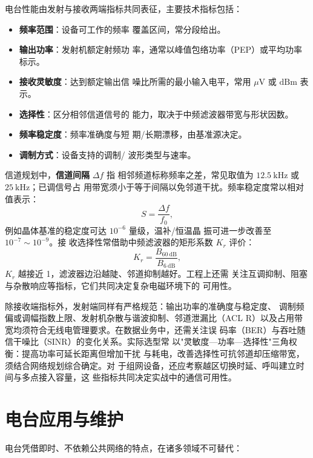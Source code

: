 电台性能由发射与接收两端指标共同表征，主要技术指标包括：

\begin{itemize}
    \item \textbf{频率范围}：设备可工作的频率
覆盖区间，常分段给出。
    \item \textbf{输出功率}：发射机额定射频功
率，通常以峰值包络功率（PEP）或平均功率标示。
    \item \textbf{接收灵敏度}：达到额定输出信
噪比所需的最小输入电平，常用 $\mu\mathrm{V}$ 或
 $\mathrm{dBm}$ 表示。
    \item \textbf{选择性}：区分相邻信道信号的
能力，取决于中频滤波器带宽与形状因数。
    \item \textbf{频率稳定度}：频率准确度与短
期/长期漂移，由基准源决定。
    \item \textbf{调制方式}：设备支持的调制/
波形类型与速率。
\end{itemize}

信道规划中，\textbf{信道间隔} $\Delta f$ 指
相邻频道标称频率之差，常见取值为 $12.5\ \mathrm{
kHz}$ 或 $25\ \mathrm{kHz}$；已调信号占
用带宽须小于等于间隔以免邻道干扰。频率稳定度常以相对值表示：
\begin{equation}
S = \frac{\Delta f}{f_0},
\end{equation}
例如晶体基准的稳定度可达 $10^{-6}$ 量级，温补/恒温晶
振可进一步改善至 $10^{-7}\sim 10^{-9}$。接
收选择性常借助中频滤波器的矩形系数 $K_{r}$ 评价：
\begin{equation}
K_r = \frac{B_{60\ \mathrm{dB}}}{B_{6\ \mathrm{dB}}},
\end{equation}
$K_r$ 越接近 1，滤波器边沿越陡、邻道抑制越好。工程上还需
关注互调抑制、阻塞与杂散响应等指标，它们共同决定复杂电磁环境下的
可用性。

除接收端指标外，发射端同样有严格规范：输出功率的准确度与稳定度、
调制频偏或调幅指数上限、发射机杂散与谐波抑制、邻道泄漏比（ACL
R）以及占用带宽均须符合无线电管理要求。在数据业务中，还需关注误
码率（BER）与吞吐随信干噪比（SINR）的变化关系。实际选型常
以"灵敏度—功率—选择性"三角权衡：提高功率可延长距离但增加干扰
与耗电，改善选择性可抗邻道却压缩带宽，须结合网络规划综合确定。对
于组网设备，还应考察越区切换时延、呼叫建立时间与多点接入容量，这
些指标共同决定实战中的通信可用性。

\section{电台应用与维护}
\label{sec:radio_station_maintenance}

电台凭借即时、不依赖公共网络的特点，在诸多领域不可替代：

